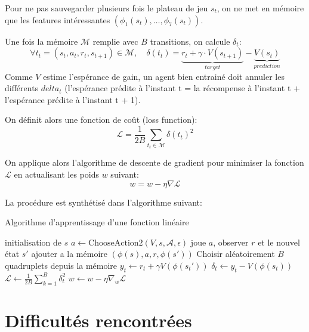 \documentclass{report}
\begin{document}
Pour ne pas sauvegarder plusieurs fois le plateau de jeu \(s_t\), on ne met en
mémoire que les features intéressantes \( (\phi_1 (s_t), \hdots, \phi_7(s_t)) \).

Une fois la mémoire \( \mathcal{M} \) remplie avec \( B \) transitions, on calcule \( \delta_t \):
\[
\forall t_t = (s_t, a_t, r_t, s_{t+1}) \in \mathcal{M},\quad
\delta(t_t) = \underbrace{r_t + \gamma \cdot V(s_{t+1})}_{target} -
\underbrace{V(s_{t})}_{prediction}
\]
Comme \( V \) estime l'espérance de gain, un agent bien entrainé doit annuler
les différents \(delta_t\) (l'espérance prédite à l'instant t = la récompense
à l'instant t + l'espérance prédite à l'instant t + 1).

On définit alors une fonction de coût (loss function):
\[
\mathcal{L} = \frac{1}{2B} \sum _{t_t \in \mathcal{M}} \delta(t_t)^2
\]

On applique alors l'algorithme de descente de gradient pour minimiser la fonction
\( \mathcal{L} \) en actualisant les poids \( w \) suivant:
\[
w = w - \eta \nabla \mathcal{L}
\]

La procédure est synthétisé dans l'algorithme suivant:

\begin{algorithm}[H]
  \caption{Algorithme d'apprentissage d'une fonction linéaire}\label{alg:linfct}
  \begin{algorithmic}
    [1]
    \Repeat{}
    \State{} initialisation de \(s\)
    \Repeat{}
    \State{} \(a \gets \mathup{ChooseAction2}(V, s, \mathcal{A}, \epsilon)\)
    \State{} joue \(a\), observer \(r\) et le nouvel \'etat \(s'\)
    \State{} ajouter a la mémoire \( \left(\phi(s), a, r, \phi(s')\right) \)
    \EndFor{}
    \State{} Choisir aléatoirement \(B\) quadruplets depuis la mémoire
    \State{} \(y_t \gets r_t + \gamma V\left(\phi(s_t')\right)\)
    \State{} \(\delta_t \gets y_t - V \left(\phi(s_t)\right)\)
    \State{} \(\mathcal{L} \gets \frac{1}{2B}\sum_{k=1}^B \delta_t^2\)
    \State{} \(w \gets w - \eta \nabla_w \mathcal{L}\)
    \EndProcedure{}
  \end{algorithmic}
\end{algorithm}

\chapter{Difficultés rencontrées}
\end{document}
